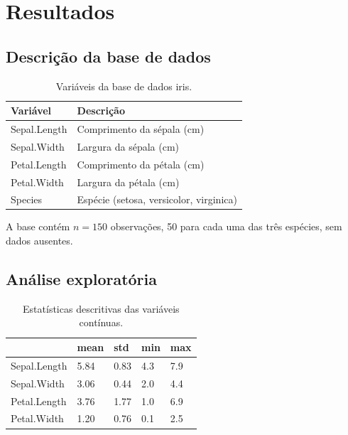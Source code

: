 \documentclass[a4paper]{_extensions/modeloufcg/modeloUFCG}
\begin{document}
\section{Resultados}\label{resultados}

\subsection{Descrição da base de
dados}\label{descriuxe7uxe3o-da-base-de-dados}

{

\begin{longtable}[]{@{}ll@{}}

\caption{\label{tbl-descricao}Variáveis da base de dados iris.}

\tabularnewline

\toprule\noalign{}
Variável & Descrição \\
\midrule\noalign{}
\endhead
\bottomrule\noalign{}
\endlastfoot
Sepal.Length & Comprimento da sépala (cm) \\
Sepal.Width & Largura da sépala (cm) \\
Petal.Length & Comprimento da pétala (cm) \\
Petal.Width & Largura da pétala (cm) \\
Species & Espécie (setosa, versicolor, virginica) \\

\end{longtable}

}

A base contém \(n=150\) observações, 50 para cada uma das três espécies,
sem dados ausentes.

\subsection{Análise exploratória}\label{anuxe1lise-exploratuxf3ria}

{

\begin{longtable}[]{@{}lllll@{}}

\caption{\label{tbl-descritivas}Estatísticas descritivas das variáveis
contínuas.}

\tabularnewline

\toprule\noalign{}
& mean & std & min & max \\
\midrule\noalign{}
\endhead
\bottomrule\noalign{}
\endlastfoot
Sepal.Length & 5.84 & 0.83 & 4.3 & 7.9 \\
Sepal.Width & 3.06 & 0.44 & 2.0 & 4.4 \\
Petal.Length & 3.76 & 1.77 & 1.0 & 6.9 \\
Petal.Width & 1.20 & 0.76 & 0.1 & 2.5 \\

\end{longtable}

}
\end{document}

